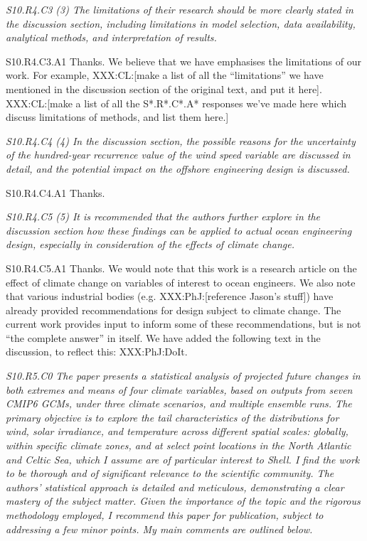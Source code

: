 \documentclass[a4paper,10pt]{article}
\begin{document}
	\emph{S10.R4.C3 (3) The limitations of their research should be more clearly stated in the discussion section, including limitations in model selection, data availability, analytical methods, and interpretation of results.}

	S10.R4.C3.A1 Thanks. We believe that we have emphasises the limitations of our work. For example, XXX:CL:[make a list of all the ``limitations'' we have mentioned in the discussion section of the original text, and put it here]. XXX:CL:[make a list of all the S*.R*.C*.A* responses we've made here which discuss limitations of methods, and list them here.]

	\emph{S10.R4.C4 (4) In the discussion section, the possible reasons for the uncertainty of the hundred-year recurrence value of the wind speed variable are discussed in detail, and the potential impact on the offshore engineering design is discussed.}

	S10.R4.C4.A1 Thanks.

	\emph{S10.R4.C5 (5) It is recommended that the authors further explore in the discussion section how these findings can be applied to actual ocean engineering design, especially in consideration of the effects of climate change.}

	S10.R4.C5.A1 Thanks. We would note that this work is a research article on the effect of climate change on variables of interest to ocean engineers. We also note that various industrial bodies (e.g. XXX:PhJ:[reference Jason's stuff]) have already provided recommendations for design subject to climate change. The current work provides input to inform some of these recommendations, but is not ``the complete answer'' in itself. We have added the following text in the discussion, to reflect this: XXX:PhJ:DoIt.

	\emph{S10.R5.C0 The paper presents a statistical analysis of projected future changes in both extremes and means of four climate variables, based on outputs from seven CMIP6 GCMs, under three climate scenarios, and multiple ensemble runs. The primary objective is to explore the tail characteristics of the distributions for wind, solar irradiance, and temperature across different spatial scales: globally, within specific climate zones, and at select point locations in the North Atlantic and Celtic Sea, which I assume are of particular interest to Shell. I find the work to be thorough and of significant relevance to the scientific community. The authors' statistical approach is detailed and meticulous, demonstrating a clear mastery of the subject matter. Given the importance of the topic and the rigorous methodology employed, I recommend this paper for publication, subject to addressing a few minor points. My main comments are outlined below.}
\end{document}
